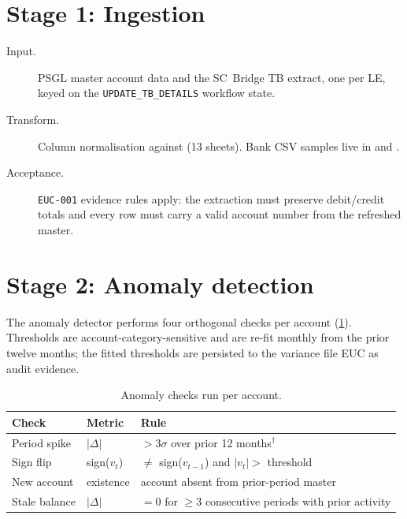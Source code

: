 \documentclass[11pt,a4paper,twoside]{report}
\begin{document}
\section{Stage 1: Ingestion}

\begin{description}
\item[Input.] PSGL master account data and the SC~Bridge TB
extract, one per LE, keyed on the \texttt{UPDATE\_TB\_DETAILS}
workflow state.
\item[Transform.] Column normalisation against
(13 sheets). Bank CSV samples live in
 and
.
\item[Acceptance.] \texttt{EUC-001} evidence rules apply: the
extraction must preserve debit/credit totals and every row
must carry a valid account number from the refreshed master.
\end{description}

\section{Stage 2: Anomaly detection}

The anomaly detector performs four orthogonal checks per account
(\cref{tab:anomalies}). Thresholds are account-category-sensitive and
are re-fit monthly from the prior twelve months; the fitted thresholds
are persisted to the variance file EUC as audit evidence.

\begin{table}[htbp]
\caption{Anomaly checks run per account.}\label{tab:anomalies}
\centering
\small
\begin{tabularx}{\linewidth}{@{}llX@{}}
\toprule
\textbf{Check} & \textbf{Metric} & \textbf{Rule} \\ \midrule
Period spike   & $|\Delta|$       & $> 3\sigma$ over prior 12 months$^{\dagger}$ \\
Sign flip       & sign($v_t$)       & $\neq$ sign($v_{t-1}$) and $|v_t| > $ threshold \\
New account     & existence         & account absent from prior-period master \\
Stale balance   & $|\Delta|$        & $= 0$ for $\ge 3$ consecutive periods with prior activity \\
\bottomrule
\end{tabularx}
\end{table}
\end{document}
